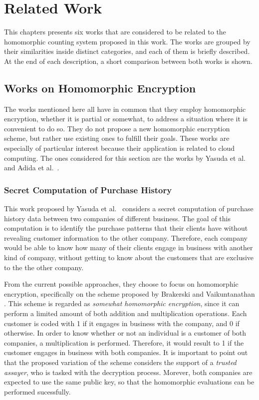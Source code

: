 \chapter{Related Work}
\label{relatedWorks}

This chapters presents six works that are considered to be related to the homomorphic counting system proposed in this work. The works are grouped by their similarities inside distinct categories, and each of them is briefly described. At the end of each description, a short comparison between both works is shown. 

\section{{Works on Homomorphic Encryption}}
The works mentioned here all have in common that they employ homomorphic encryption, whether it is partial or somewhat, to address a situation where it is convenient to do so. They do not propose a new homomorphic encryption scheme, but rather use existing ones to fulfill their goals. These works are especially of particular interest because their application is related to cloud computing. The ones considered for this section are the works by Yasuda et al.\ \cite{Yasuda:2015:SDD:2732516.2732521, yasuda2014} and Adida et al.\ \cite{adida2008helios}.

\subsection{Secret Computation of Purchase History}
This work proposed by Yasuda et al.\ \cite{yasuda2014} considers a secret computation of purchase history data between two companies of different business. The goal of this computation is to identify the purchase patterns that their clients have without revealing customer information to the other company. Therefore, each company would be able to know how many of their clients engage in business with another kind of company, without getting to know about the customers that are exclusive to the the other company.

From the current possible approaches, they choose to focus on homomorphic encryption, specifically on the scheme proposed by Brakerski and Vaikuntanathan \cite{cryptoeprint:2011:277}. This scheme is regarded as \emph{somewhat homomorphic encryption}, since it can perform a limited amount of both addition and multiplication operations. Each customer is coded with 1 if it engages in business with the company, and 0 if otherwise. In order to know whether or not an individual is a customer of both companies, a multiplication is performed. Therefore, it would result to 1 if the customer engages in business with both companies. It is important to point out that the proposed variation of the scheme considers the support of a \emph{trusted assayer}, who is tasked with the decryption process. Morever, both companies are expected to use the same public key, so that the homomorphic evaluations can be performed sucessfully.


